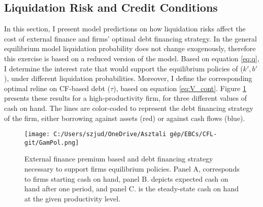 \documentclass[12pt]{article}
\begin{document}
\subsection{Liquidation Risk and Credit Conditions \label{sec:appliqrisk}}

In this section, I present model predictions on how liquidation risks affect the cost of external finance and firms' optimal debt financing strategy. In the general equilibrium model liquidation probability does not change exogenously, therefore this exercise is based on a reduced version of the model. Based on equation \ref{eq:q}, I determine the interest rate that would support the equilibrium policies of ($k',b'$), under different liquidation probabilities. Moreover, I define the corresponding optimal reline on CF-based debt ($\tau$), based on equation \ref{eq:V_cont}. Figure \ref{chart:liqprob} presents these results for a high-productivity firm, for three different values of cash on hand. The lines are color-coded to represent the debt financing strategy of the firm, either borrowing against assets (red) or against cash flows (blue). \\

\begin{figure}[H]  %
    \centering  
    \texttt{[image: C:/Users/szjud/OneDrive/Asztali gép/EBCs/CFL-git/GamPol.png]}
    \caption{ \small External finance premium based and debt financing strategy necessary to support firms equilibrium policies. Panel A, corresponds to firms starting cash on hand, panel B. depicts expected cash on hand after one period, and panel C. is the steady-state cash on hand at the given productivity level.}
    \label{chart:liqprob}
\end{figure}
\end{document}
